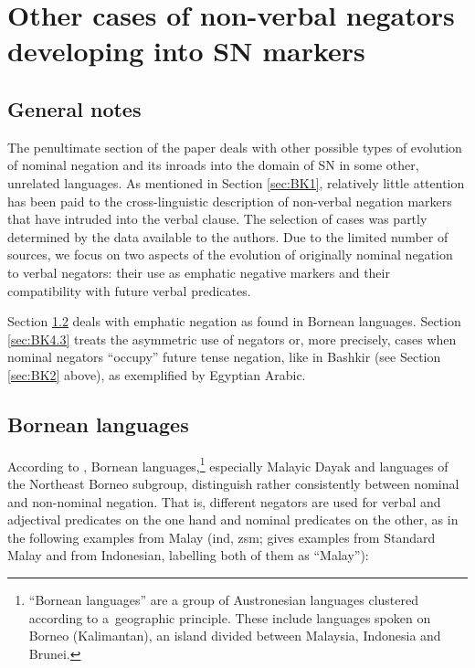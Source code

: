 \documentclass[output=paper]{langsci/langscibook}
\begin{document}
\section{Other cases of non-verbal negators developing into SN markers}\label{sec:BK4}

\subsection{General notes}\label{sec:BK4.1}

The penultimate section of the paper deals with other possible types of evolution of nominal negation and its inroads into the domain of SN in some other, unrelated languages. As mentioned in Section \ref{sec:BK1}, relatively little attention has been paid to the cross-linguistic description of non-verbal negation markers that have intruded into the verbal clause. The selection of cases was partly determined by the data available to the authors. Due to the limited number of sources, we focus on two aspects of the evolution of originally nominal negation to verbal negators: their use as emphatic negative markers and their compatibility with future verbal predicates.

Section \ref{sec:BK4.2} deals with emphatic negation as found in Bornean languages. Section \ref{sec:BK4.3} treats the asymmetric use of negators or, more precisely, cases when nominal negators “occupy” future tense negation, like in Bashkir (see Section \ref{sec:BK2} above), as exemplified by Egyptian Arabic.

\subsection{Bornean languages}\label{sec:BK4.2}

According to \citet{kroeger2014a}, Bornean languages,\footnote{“Bornean languages” are a group of Austronesian languages clustered according to a geographic principle. These include languages spoken on Borneo (Kalimantan), an island divided between Malaysia, Indonesia and Brunei.} especially Malayic Dayak and languages of the Northeast Borneo subgroup, distinguish rather consistently between nominal and non-nominal negation. That is, different negators are used for verbal and adjectival predicates on the one hand and nominal predicates on the other, as in the following examples from Malay (ind, zsm; \citeauthor{kroeger2014a} gives examples from Standard Malay and from Indonesian, labelling both of them as “Malay”):
\end{document}
